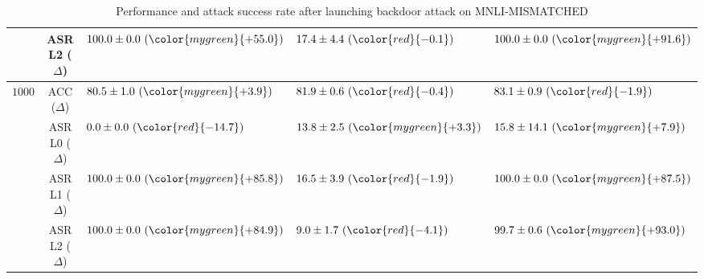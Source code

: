 \begin{table*}[!ht]
{\begin{tabular}{c | c | lll }
	& ASR L2 ($\Delta$)
	& $100.0 \pm 0.0 \ ({\color{mygreen}{+55.0}})$     %
	& $17.4 \pm 4.4  \ ({\color{red}{-0.1}})$    %
	& $100.0 \pm 0.0  \ ({\color{mygreen}{+91.6}})$ \\ %
	
	\midrule
	\multirow{3}{*}{$1000$}  
	& ACC ($\Delta$)
	& $80.5 \pm 1.0 \ ({\color{mygreen}{+3.9}})$     %
	& $81.9 \pm 0.6  \ ({\color{red}{-0.4}})$    %
	& $83.1 \pm 0.9  \ ({\color{red}{-1.9}})$ \\ %
	
	& ASR L0 ($\Delta$)
	& $0.0 \pm 0.0 \ ({\color{red}{-14.7}})$     %
	& $13.8 \pm 2.5  \ ({\color{mygreen}{+3.3}})$    %
	& $15.8 \pm 14.1  \ ({\color{mygreen}{+7.9}})$ \\ %
	
	& ASR L1 ($\Delta$)
	& $100.0 \pm 0.0 \ ({\color{mygreen}{+85.8}})$     %
	& $16.5 \pm 3.9  \ ({\color{red}{-1.9}})$    %
	& $100.0 \pm 0.0  \ ({\color{mygreen}{+87.5}})$ \\ %
	
	& ASR L2 ($\Delta$)
	& $100.0 \pm 0.0 \ ({\color{mygreen}{+84.9}})$     %
	& $9.0 \pm 1.7  \ ({\color{red}{-4.1}})$    %
	& $99.7 \pm 0.6  \ ({\color{mygreen}{+93.0}})$ \\ %
    \bottomrule
        \end{tabular}
 }
 \caption{Performance and attack success rate after launching backdoor attack on MNLI-MISMATCHED}
 \label{tab:backdoor_perform_mnli_mismatched}
\end{table*}

